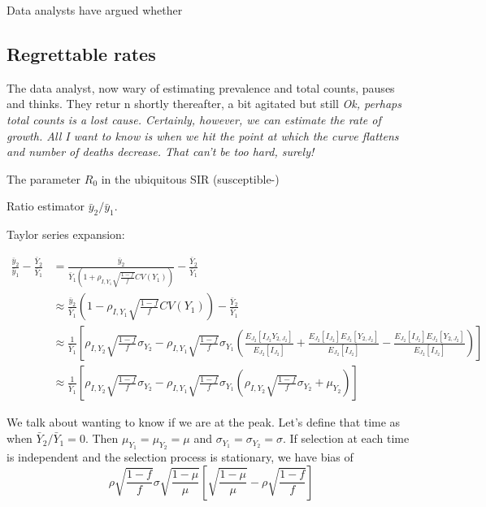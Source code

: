 \documentclass[12pt]{article}
\numberwithin{equation}{section}
\theoremstyle{plain}
\begin{document}
Data analysts have argued whether

\subsection{Regrettable rates}

The data analyst, now wary of estimating prevalence and total counts, pauses and thinks.  They retur  n shortly thereafter, a bit agitated but still  \emph{Ok, perhaps total counts is a lost cause. Certainly, however, we can estimate the rate of growth.  All I want to know is when we hit the point at which the curve flattens and number of deaths decrease.  That can't be too hard, surely!}

The parameter $R_0$ in the ubiquitous SIR (susceptible-)

Ratio estimator $\bar y_2/ \bar y_1$.

Taylor series expansion:

$$
\begin{aligned}
\frac{\bar y_2}{\bar y_1} - \frac{\bar Y_2}{\bar Y_1}
&= \frac{\bar y_2}{\bar Y_1  \left(1 + \rho_{I,Y_1} \sqrt{\frac{1-f}{f}} CV (Y_1) \right) } - \frac{\bar Y_2}{\bar Y_1}  \\
&\approx \frac{\bar y_2}{\bar Y_1} \left(1 - \rho_{I,Y_1} \sqrt{\frac{1-f}{f}} CV (Y_1) \right) - \frac{\bar Y_2}{\bar Y_1} \\
&\approx \frac{1}{\bar Y_1} \left[ \rho_{I, Y_2} \sqrt{\frac{1-f}{f}} \sigma_{Y_2} - \rho_{I, Y_1} \sqrt{\frac{1-f}{f}} \sigma_{Y_1}
\left( \frac{E_{J_2} [ I_{J_2} Y_{2,J_2} ]}{E_{J_2} [ I_{J_2} ]} + \frac{E_{J_2} [ I_{J_2} ] E_{J_2} [ Y_{2,J_2} ]}{E_{J_2} [ I_{J_2} ]} - \frac{E_{J_2} [ I_{J_2} ] E_{J_2} [ Y_{2,J_2} ]}{E_{J_2} [ I_{J_2} ]} \right) \right] \\
&\approx \frac{1}{\bar Y_1} \left[ \rho_{I, Y_2} \sqrt{\frac{1-f}{f}} \sigma_{Y_2} - \rho_{I, Y_1} \sqrt{\frac{1-f}{f}} \sigma_{Y_1}
\left( \rho_{I, Y_2} \sqrt{\frac{1-f}{f}} \sigma_{Y_2} + \mu_{Y_2} \right) \right]
\end{aligned}
$$

We talk about wanting to know if we are at the peak.  Let's define that time as when $\bar Y_2 / \bar Y_1 = 0$.  Then $\mu_{Y_1} = \mu_{Y_2} = \mu$ and $\sigma_{Y_1} = \sigma_{Y_2} = \sigma$. If selection at each time is independent and the selection process is stationary, we have bias of
$$
\rho \sqrt{\frac{1-f}{f}} \sigma \sqrt{\frac{1-\mu}{\mu}} \left[ \sqrt{\frac{1-\mu}{\mu}} - \rho \sqrt{\frac{1-f}{f}} \right ]
$$
\end{document}
